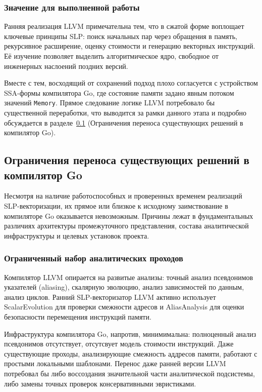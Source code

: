\subsubsection{Значение для выполненной работы}

Ранняя реализация LLVM примечательна тем, что в сжатой форме воплощает ключевые принципы SLP: поиск начальных пар через обращения в память,
рекурсивное расширение, оценку стоимости и генерацию векторных инструкций. 
Её изучение позволяет выделить алгоритмическое ядро, свободное от инженерных наслоений поздних версий. 

Вместе с тем, восходящий от сохранений подход плохо согласуется с устройством SSA-формы компилятора Go,
где состояние памяти задано явным потоком значений \texttt{Memory}.
Прямое следование логике LLVM потребовало бы существенной переработки,
что выводится за рамки данного этапа и подробно обсуждается в разделе~\ref{sec:go_limitations} 
(Ограничения переноса существующих решений в компилятор Go).

\subsection{Ограничения переноса существующих решений в компилятор Go}
\label{sec:go_limitations}

Несмотря на наличие работоспособных и проверенных временем реализаций SLP-векторизации, 
их прямое или близкое к исходному заимствование в компиляторе Go оказывается невозможным. 
Причины лежат в фундаментальных различиях архитектуры промежуточного представления, состава аналитической инфраструктуры и целевых установок проекта.

\subsubsection{Ограниченный набор аналитических проходов}

Компилятор LLVM опирается на развитые анализы: точный анализ псевдонимов указателей (aliasing), скалярную эволюцию, анализ зависимостей по данным, анализ циклов. 
Ранний SLP-векторизатор LLVM активно использует ScalarEvolution для проверки смежности адресов и AliasAnalysis для оценки безопасности перемещения инструкций памяти.

Инфраструктура компилятора Go, напротив, минимимальна: полноценный анализ псевдонимов отсутствует, отсутсвует модель стоимости инструкций. 
Даже существующие проходы, анализирующие смежность аддресов памяти, работают с простыми локальными шаблонами. 
Перенос даже ранней версии LLVM потребовал бы либо воссоздания значительной части аналитической подсистемы, либо замены точных проверок консервативными эвристиками.

